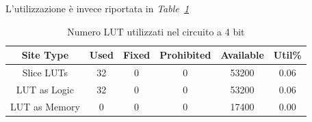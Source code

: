 L'utilizzazione è invece riportata in \textit{Table~\ref{lut_utilization_16bit}}
\begin{table}[ht]
      \centering
      \begin{tabular}{|c|c|c|c|c|c|}
        \hline
        Site Type & Used & Fixed & Prohibited & Available & Util\% \\ \hline
        Slice LUTs & 32 & 0 & 0 & 53200 & $0.06$ \\ \hline
         LUT as Logic & 32 & 0 & 0 & 53200 & $0.06$ \\ \hline 
         LUT as Memory  & 0 & 0 & 0 & 17400 & $0.00$ \\ \hline
      \end{tabular}
      \caption{Numero LUT utilizzati nel circuito a 4 bit}
      \label{lut_utilization_16bit}
\end{table}


